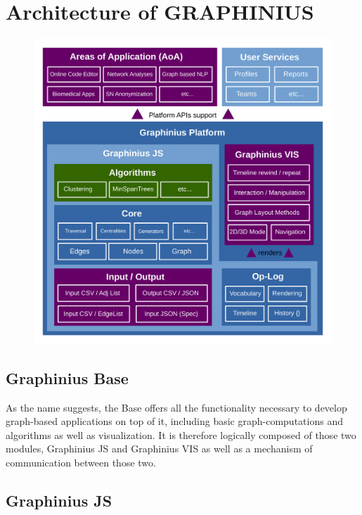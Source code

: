 \chapter{Architecture of GRAPHINIUS}
\label{ch:graphinius_architecture}

\begin{figure}[ht]
	\label{fig_graphinius_architecture}
% 
\hspace*{-0.5cm}
\includegraphics[width=1.1\textwidth]{figures/Graphinius_Architecture_pdf}
\end{figure}



\section{Graphinius Base}
\label{sect:graphinius_base}

As the name suggests, the Base offers all the functionality necessary to develop graph-based applications on top of it, including basic graph-computations and algorithms as well as visualization. It is therefore logically composed of those two modules, Graphinius JS and Graphinius VIS as well as a mechanism of communication between those two.
	

\section{Graphinius JS}
\label{sect:graphinius_js}

